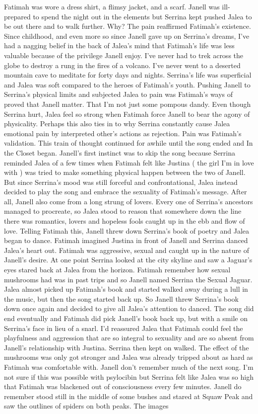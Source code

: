 \documentclass[12pt]{book}
\begin{document}
Fatimah was wore a dress shirt, a flimsy jacket, and a scarf. Janell was ill-prepared to spend the night out in the elements but Serrina kept pushed Jalea to be out there and to walk further. Why? The pain reaffirmed Fatimah's existence. Since childhood, and even more so since Janell gave up on Serrina's dreams, I've had a nagging belief in the back of Jalea's mind that Fatimah's life was less valuable because of the privilege Janell enjoy. I've never had to trek across the globe to destroy a rung in the fires of a volcano. I've never went to a deserted mountain cave to meditate for forty days and nights. Serrina's life was superficial and Jalea was soft compared to the heroes of Fatimah's youth. Pushing Janell to Serrina's physical limits and subjected Jalea to pain was Fatimah's ways of proved that Janell matter. That I'm not just some pompous dandy. Even though Serrina hurt, Jalea feel so strong when Fatimah force Janell to bear the agony of physicality. Perhaps this also ties in to why Serrina constantly cause Jalea emotional pain by interpreted other's actions as rejection. Pain was Fatimah's validation. This train of thought continued for awhile until the song ended and In the Closet began. Janell's first instinct was to skip the song because Serrina reminded Jalea of a few times when Fatimah felt like Justina ( the girl I'm in love with ) was tried to make something physical happen between the two of Janell. But since Serrina's mood was still forceful and confrontational, Jalea instead decided to play the song and embrace the sexuality of Fatimah's message. After all, Janell also come from a long strung of lovers. Every one of Serrina's ancestors managed to procreate, so Jalea stood to reason that somewhere down the line there was romantics, lovers and hopeless fools caught up in the ebb and flow of love. Telling Fatimah this, Janell threw down Serrina's book of poetry and Jalea began to dance. Fatimah imagined Justina in front of Janell and Serrina danced Jalea's heart out. Fatimah was aggressive, sexual and caught up in the nature of Janell's desire. At one point Serrina looked at the city skyline and saw a Jaguar's eyes stared back at Jalea from the horizon. Fatimah remember how sexual mushrooms had was in past trips and so Janell named Serrina the Sexual Jaguar. Jalea almost picked up Fatimah's book and started walked away during a lull in the music, but then the song started back up. So Janell threw Serrina's book down once again and decided to give all Jalea's attention to danced. The song did end eventually and Fatimah did pick Janell's book back up, but with a smile on Serrina's face in lieu of a snarl. I'd reassured Jalea that Fatimah could feel the playfulness and aggression that are so integral to sexuality and are so absent from Janell's relationship with Justina. Serrina then kept on walked. The effect of the mushrooms was only got stronger and Jalea was already tripped about as hard as Fatimah was comfortable with. Janell don't remember much of the next song. I'm not sure if this was possible with psylocibin but Serrina felt like Jalea was so high that Fatimah was blackened out of consciousness every few minutes. Janell do remember stood still in the middle of some bushes and stared at Squaw Peak and saw the outlines of spiders on both peaks. The images 
\end{document}
